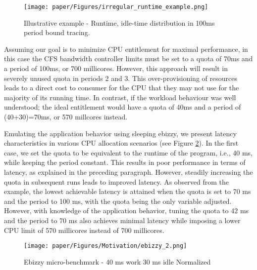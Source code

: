 \begin{figure}[h]
    \centering
    \texttt{[image: paper/Figures/irregular\_runtime\_example.png]}
    \caption{Illustrative example - Runtime, idle-time distribution in 100ms period bound tracing.
    \label{fig:runtime-idle-distro}}
    \end{figure}

Assuming our goal is to minimize CPU entitlement for maximal performance, in this case the CFS bandwidth controller limits must be set to a quota of 70ms and a period of 100ms, or 700 millicores. However, this approach will result in severely unused quota in periods 2 and 3. This over-provisioning of resources leads to a direct cost to consumer for the CPU that they may not use for the majority of its running time. In contrast, if the workload behaviour was well understood; the ideal entitlement would have a quota of 40ms and a period of (40+30)=70ms, or 570 millcores instead.

Emulating the application behavior using sleeping ebizzy, we present latency characteristics in various CPU allocation scenarios (see Figure \ref{fig:mot_ebizzy2}). In the first case, we set the quota to be equivalent to the runtime of the program, i.e., 40 ms, while keeping the period constant. This results in poor performance in terms of latency, as explained in the preceding paragraph. However, steadily increasing the quota in subsequent runs leads to improved latency. As observed from the example, the lowest achievable latency is attained when the quota is set to 70 ms and the period to 100 ms, with the quota being the only variable adjusted. However, with knowledge of the application behavior, tuning the quota to 42 ms and the period to 70 ms also achieves minimal latency while imposing a lower CPU limit of 570 millicores instead of 700 millicores.



\begin{figure}[h]
    \centering
    \texttt{[image: paper/Figures/Motivation/ebizzy\_2.png]}
    \caption{Ebizzy micro-benchmark - 40 ms work 30 ms idle Normalized } \label{fig:mot_ebizzy2}
    \end{figure}

